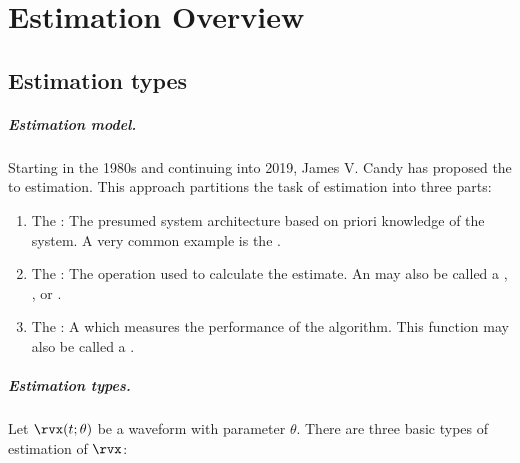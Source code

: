 
\chapter{Estimation Overview}
\label{app:est}
\label{chp:est}
\section{Estimation types}
\paragraph{Estimation model.}
Starting in the 1980s and continuing into 2019, James V. Candy has proposed 
the  
to estimation. This approach partitions the task of estimation into three parts:
\begin{enumerate}
  \item The :
        The presumed system architecture based on priori knowledge
        of the system.
        A very common example is the .
  \item The : 
        The operation used to calculate the estimate.
        An  may also be called a ,
        , or .
  \item The : 
        A  which measures the performance
        of the algorithm.
        This function may also be called a . 
\end{enumerate}

\paragraph{Estimation types.}
Let $\rvx(t;\theta)$ be a waveform with parameter $\theta$.
There are three basic types of estimation of $\rvx$:

